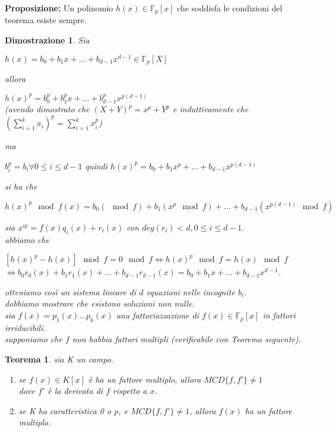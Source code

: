 \documentclass[a4paper,12pt]{article}
\theoremstyle{def}
\theoremstyle{prop}
\theoremstyle{esempio}
\theoremstyle{dimostrazione}
\newtheorem*{dimostrazione}{Dimostrazione}
\theoremstyle{teo}
\newtheorem*{teorema}{Teorema}
\theoremstyle{osservazione}
\begin{document}
\newpage

\textbf{Proposizione:} Un polinomio \(h(x) \in \mathbb{F}_p[x]\) che soddisfa le condizioni del teorema esiste sempre.\\
\begin{dimostrazione}
	Sia
	\begin{center}
		\(h(x) = b_0 + b_1 x + ... + b_{d - 1} x^{d - 1} \in \mathbb{F}_p[X]\)
	\end{center}
	allora
	\begin{center}
		\(h(x)^p = b_0^p + b_1^p x + ... + b_{d - 1}^p x^{p(d - 1)}\)\\
		(avendo dimostrato che \((X + Y)^p = x^p + Y^p\) e induttivamente che \((\sum_{i=1}^{k} x_i)^p = \sum_{i=1}^{k} x_i^p\))
	\end{center}
	ma
	\begin{center}
		\(b_i^p = b_i \forall 0 \leq i \leq d - 1\) quindi \(h(x)^p = b_0 + b_1 x^p + ... + b_{d - 1} x^{p(d - 1)}\)
	\end{center}
	si ha che
	\begin{center}
		\(h(x)^p \mod f(x) = b_0 (\mod f) + b_1 (x^p \mod f) + ... + b_{d - 1} (x^{p(d - 1)} \mod f)\)
	\end{center}
	sia \(x^{ip} = f(x) q_i(x) + r_i(x)\) con \(deg(r_i) < d, 0 \leq i \leq d - 1\).\\
	abbiamo che
	\begin{center}
		\([h(x)^p - h(x)] \mod f = 0 \mod f \iff h(x)^p \mod f = h(x) \mod f\)\\
		\(\iff b_0 r_0(x) + b_1 r_1(x) + ... + b_{d - 1} r_{d - 1}(x) = b_0 + b_1 x + ... + b_{d - 1} x^{d - 1}\).
	\end{center}
	otteniamo così un sistema lineare di \(d\) equazioni nelle incognite \(b_i\).\\
	dobbiamo mostrare che esistono soluzioni non nulle.\\
	sia \(f(x) = p_1(x) ... p_k(x)\) una fattoriazzazione di \(f(x) \in \mathbb{F}_p[x]\) in fattori irriducibili.\\
	supponiamo che \(f\) non habbia fattori multipli (verificabile con Teorema seguente).\\
\end{dimostrazione}

\begin{teorema}
	sia K un campo.
	\begin{enumerate}
		\item se \(f(x) \in K[x]\) è ha un fattore multiplo, allora \(MCD\{f, f'\} \neq 1\)\\
		      dove \(f'\) è la derivata di \(f\) rispetto a \(x\).
		\item se K ha caratteristica 0 o \(p\), e \(MCD\{f, f'\} \neq 1\), allora \(f(x)\) ha un fattore multiplo.
	\end{enumerate}
\end{teorema}
\end{document}
